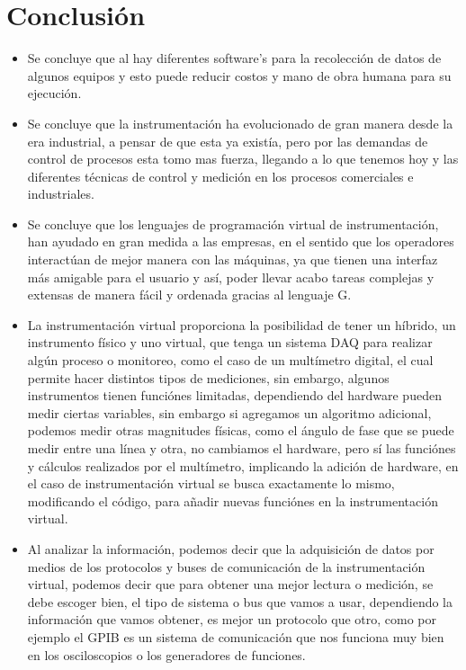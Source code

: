 \documentclass[12pt,letterpaper, onecolumn, titlepage, oneside]{book}
\begin{document}
\chapter{Conclusión}

\begin{itemize}
\item Se concluye que al hay diferentes software's para la recolección de datos de algunos equipos y esto puede reducir costos y mano de obra humana para su ejecución.
\item Se concluye que la instrumentación ha evolucionado de gran manera desde la era industrial, a pensar de que esta ya existía, pero por las demandas de control de procesos esta tomo mas fuerza, llegando a lo que tenemos hoy y las diferentes técnicas de control y medición en los procesos comerciales e industriales.
\item Se concluye que los lenguajes de programación virtual de instrumentación, han ayudado en gran medida a las empresas, en el sentido que los operadores interactúan de mejor manera con las máquinas, ya que tienen una interfaz más amigable para el usuario y así, poder llevar acabo tareas complejas y extensas de manera fácil y ordenada gracias al lenguaje G.

\item La instrumentación virtual proporciona la posibilidad de tener un híbrido, un instrumento físico y uno virtual, que tenga un sistema DAQ para realizar algún proceso o monitoreo, como el caso de un multímetro digital, el cual permite hacer distintos tipos de mediciones, sin embargo, algunos instrumentos tienen funciónes limitadas, dependiendo del hardware pueden medir ciertas variables, sin embargo si agregamos un algoritmo adicional, podemos medir otras magnitudes físicas, como el ángulo de fase que se puede medir entre una línea y otra, no cambiamos el hardware, pero sí las funciónes y cálculos realizados por el multímetro, implicando la adición de hardware, en el caso de instrumentación virtual se busca exactamente lo mismo, modificando el código, para añadir nuevas funciónes en la instrumentación virtual.

\item Al analizar la información, podemos decir que la adquisición de datos por medios de los protocolos y buses de comunicación de la instrumentación virtual, podemos decir que para obtener una mejor lectura o medición, se debe escoger bien, el tipo de sistema o bus que vamos a usar, dependiendo la información que vamos obtener, es mejor un protocolo que otro, como por ejemplo el GPIB es un sistema de comunicación que nos funciona muy bien en los osciloscopios o los generadores de funciones. 



\end{itemize}
\end{document}
